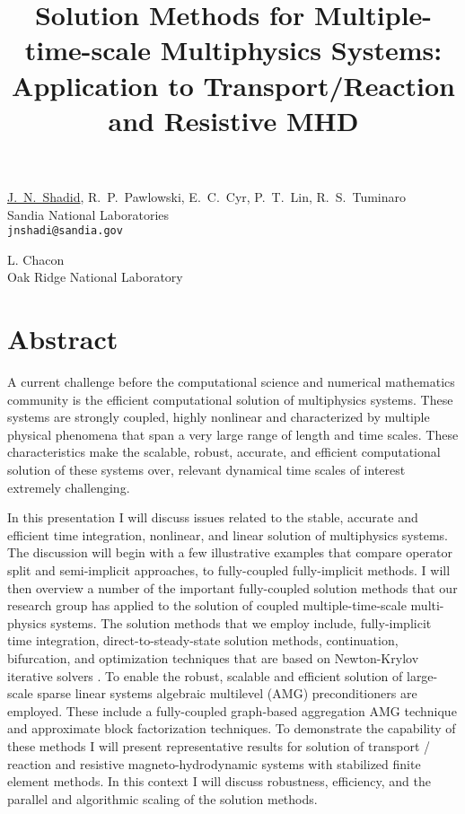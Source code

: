 \title{Solution Methods for Multiple-time-scale Multiphysics Systems: Application to Transport/Reaction and Resistive MHD}
\author{} \institute{}
\maketitle

\begin{center}
{\large \underline{J.~N.~Shadid}, R.~P.~Pawlowski, E.~C.~Cyr, P.~T.~Lin, R.~S.~Tuminaro}\\
Sandia National Laboratories\\
{\tt jnshadi@sandia.gov}\\
\vspace{4mm}

{\large L. Chacon}\\
Oak Ridge National Laboratory
\end{center}

\section*{Abstract}
A current challenge before the computational science and numerical mathematics community is the efficient computational solution of multiphysics systems.  These systems are strongly coupled, highly nonlinear and characterized by multiple physical phenomena that span a very large range of length and time scales.   These characteristics make the scalable, robust, accurate, and efficient computational solution of these systems over, relevant dynamical time scales of interest extremely challenging.

In this presentation I will discuss issues related to the stable, accurate and efficient time integration, nonlinear, and linear solution of multiphysics systems. The discussion will begin with a few illustrative examples that compare operator split and semi-implicit approaches, to fully-coupled fully-implicit methods. I will then overview a number of the important fully-coupled solution methods that our research group has applied to the solution of coupled multiple-time-scale multi-physics systems. The solution methods that we employ include, fully-implicit time integration, direct-to-steady-state solution methods, continuation, bifurcation, and optimization techniques that are based on Newton-Krylov iterative solvers \cite{shadid1,shadid2}. To enable the robust, scalable and efficient solution of large-scale sparse  linear systems algebraic multilevel (AMG) preconditioners are employed. These include a fully-coupled graph-based aggregation AMG technique and approximate block factorization techniques. To demonstrate the capability of these methods I will present representative results for solution of transport / reaction and resistive 
magneto-hydrodynamic systems with stabilized finite element methods. In this context I will discuss robustness, efficiency, and the parallel and algorithmic scaling of the solution methods.

